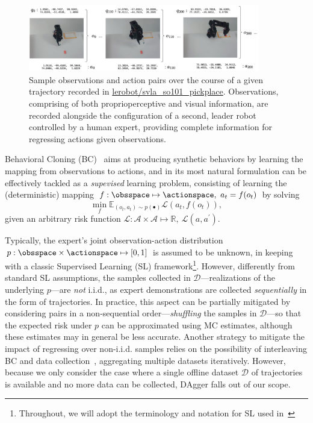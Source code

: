 \begin{figure}
    \centering
    \includegraphics[width=0.9\textwidth]{figures/ch4/ch4-observation-action-mapping.png}
    \caption{Sample observations and action pairs over the course of a given trajectory recorded in \url{lerobot/svla_so101_pickplace}. Observations, comprising of both proprioperceptive and visual information, are recorded alongside the configuration of a second, leader robot controlled by a human expert, providing complete information for regressing actions given observations.}
    \label{fig:ch4-observation-action-mapping}
\end{figure}

Behavioral Cloning (BC)~\citep{pomerleauALVINNAutonomousLand1988a} aims at producing synthetic behaviors by learning the mapping from observations to actions, and in its most natural formulation can be effectively tackled as a \emph{supevised} learning problem, consisting of learning the (deterministic) mapping \(f: \obsspace \mapsto \actionspace, \ a_t = f(o_t) \) by solving
\begin{equation}\label{eq:loss-minimization-SL}
    \min_{f} \mathbb{E}_{(o_t, a_t) \sim p(\bullet)} \mathcal L(a_t, f(o_t)),
\end{equation}
given an arbitrary risk function \( \mathcal L:  \mathcal A \times \mathcal A \mapsto \mathbb{R}, \ \mathcal L (a, a^\prime) \).

Typically, the expert's joint observation-action distribution \( p: \obsspace \times \actionspace \mapsto [0,1] \) is assumed to be unknown, in keeping with a classic Supervised Learning (SL) framework\footnote{Throughout, we will adopt the terminology and notation for SL used in~\citet{shalev-shwartzUnderstandingMachineLearning2014}}.
However, differently from standard SL assumptions, the samples collected in \( \mathcal D \)---realizations of the underlying \( p \)---are \emph{not} i.i.d., as expert demonstrations are collected \emph{sequentially} in the form of trajectories.
In practice, this aspect can be partially mitigated by considering pairs in a non-sequential order---\emph{shuffling} the samples in \(\mathcal D \)---so that the expected risk under \( p \) can be approximated using MC estimates, although these estimates may in general be less accurate.
Another strategy to mitigate the impact of regressing over non-i.i.d. samples relies on the possibility of interleaving BC and data collection~\citep[DAgger]{rossReductionImitationLearning2011}, aggregating multiple datasets iteratively.
However, because we only consider the case where a single offline dataset \( \mathcal D \) of trajectories is available and no more data can be collected, DAgger falls out of our scope.


